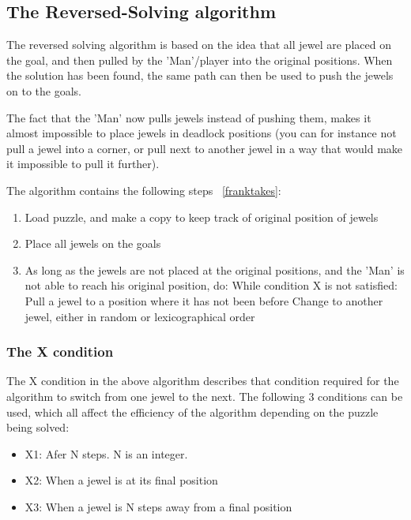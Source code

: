 \subsection{The Reversed-Solving algorithm}
The reversed solving algorithm is based on the idea that all jewel are placed on the goal, and then pulled by the 'Man'/player into the original positions. When the solution has been found, the same path can then be used to push the jewels on to the goals.

The fact that the 'Man' now pulls jewels instead of pushing them, makes it almost impossible to place jewels in deadlock positions (you can for instance not pull a jewel into a corner, or pull next to another jewel in a way that would make it impossible to pull it further).

The algorithm contains the following steps ~\ref{franktakes}:

\begin{enumerate}
\item Load puzzle, and make a copy to keep track of original position of jewels
\item Place all jewels on the goals
\item As long as the jewels are not placed at the original positions, and the 'Man' is not able to reach his original position, do:
\subitem While condition X is not satisfied:
\subsubitem Pull a jewel to a position where it has not been before
\subitem Change to another jewel, either in random or lexicographical order
\end{enumerate}

\subsubsection{The X condition}
The X condition in the above algorithm describes that condition required for the algorithm to switch from one jewel to the next. The following 3 conditions can be used, which all affect the efficiency of the algorithm depending on the puzzle being solved:

\begin{itemize}
\item X1: Afer N steps. N is an integer.
\item X2: When a jewel is at its final position
\item X3: When a jewel is N steps away from a final position
\end{itemize}

